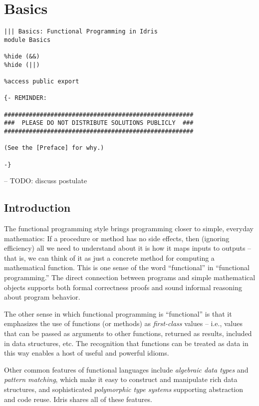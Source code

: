 \section{Basics}\label{basics}

\begin{verbatim}
||| Basics: Functional Programming in Idris
module Basics

%hide (&&)
%hide (||)

%access public export

{- REMINDER:

#####################################################
###  PLEASE DO NOT DISTRIBUTE SOLUTIONS PUBLICLY  ###
#####################################################

(See the [Preface] for why.)

-}
\end{verbatim}

-- TODO: discuss postulate

\subsection{Introduction}\label{introduction}

The functional programming style brings programming closer to simple,
everyday mathematics: If a procedure or method has no side effects, then
(ignoring efficiency) all we need to understand about it is how it maps
inputs to outputs -- that is, we can think of it as just a concrete
method for computing a mathematical function. This is one sense of the
word ``functional'' in ``functional programming.'' The direct connection
between programs and simple mathematical objects supports both formal
correctness proofs and sound informal reasoning about program behavior.

The other sense in which functional programming is ``functional'' is
that it emphasizes the use of functions (or methods) as
\emph{first-class} values -- i.e., values that can be passed as
arguments to other functions, returned as results, included in data
structures, etc. The recognition that functions can be treated as data
in this way enables a host of useful and powerful idioms.

Other common features of functional languages include \emph{algebraic
data types} and \emph{pattern matching}, which make it easy to construct
and manipulate rich data structures, and sophisticated \emph{polymorphic
type systems} supporting abstraction and code reuse. Idris shares all of
these features.

